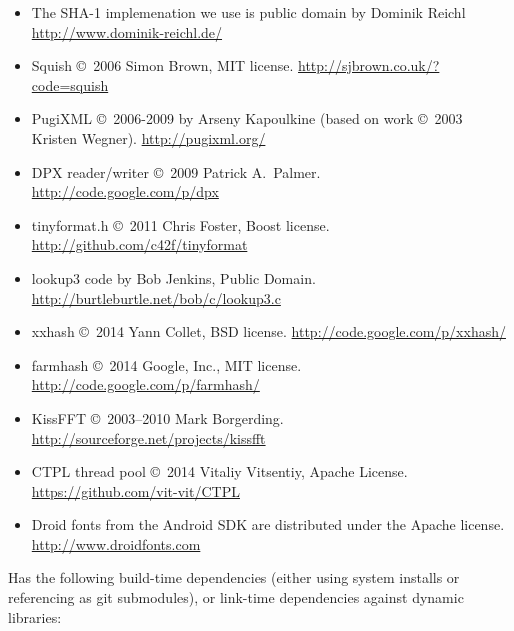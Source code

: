\begin{itemize}
\item The SHA-1 implemenation we use is public domain by
Dominik Reichl \\ \url{http://www.dominik-reichl.de/}
\item Squish \copyright\ 2006 Simon Brown, MIT license.
\url{http://sjbrown.co.uk/?code=squish}
\item PugiXML \copyright\ 2006-2009 by Arseny Kapoulkine (based on work
\copyright\ 2003 Kristen Wegner). \url{http://pugixml.org/}
\item DPX reader/writer \copyright\ 2009 Patrick A.\ Palmer.
\url{http://code.google.com/p/dpx}
\item {\cf tinyformat.h} \copyright\ 2011 Chris Foster, Boost
    license. \url{http://github.com/c42f/tinyformat}
\item {\cf lookup3} code by Bob Jenkins, Public Domain.
\url{http://burtleburtle.net/bob/c/lookup3.c}
\item {\cf xxhash} \copyright\ 2014 Yann Collet, BSD license.
\url{http://code.google.com/p/xxhash/}
\item {\cf farmhash} \copyright\ 2014 Google, Inc., MIT license.
\url{http://code.google.com/p/farmhash/}
\item {\cf KissFFT} \copyright\ 2003--2010 Mark Borgerding.
\url{http://sourceforge.net/projects/kissfft}
\item {\cf CTPL} thread pool \copyright\ 2014 Vitaliy Vitsentiy, Apache License.
\url{https://github.com/vit-vit/CTPL}
\item Droid fonts from the Android SDK are distributed under the
    Apache license. \\ \url{http://www.droidfonts.com}
\end{itemize}

\noindent \product Has the following build-time dependencies (either using
system installs or referencing as git submodules), or link-time dependencies
against dynamic libraries:

